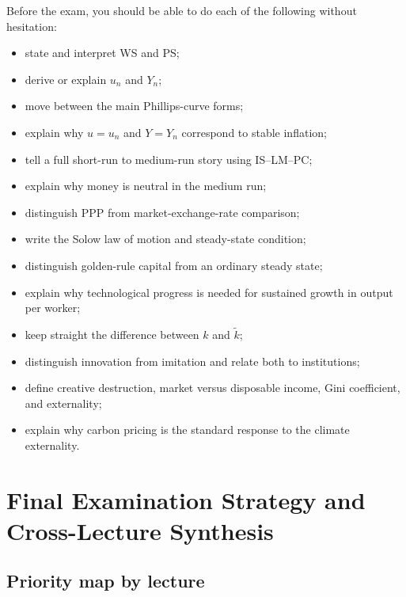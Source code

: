 \documentclass[12pt]{article}
\begin{document}
\begin{examtip}[title={Exam Focus: Final checklist}]
Before the exam, you should be able to do each of the following without hesitation:
\begin{itemize}[leftmargin=1.5em]
\item state and interpret WS and PS;
\item derive or explain \(u_n\) and \(Y_n\);
\item move between the main Phillips-curve forms;
\item explain why \(u=u_n\) and \(Y=Y_n\) correspond to stable inflation;
\item tell a full short-run to medium-run story using IS--LM--PC;
\item explain why money is neutral in the medium run;
\item distinguish PPP from market-exchange-rate comparison;
\item write the Solow law of motion and steady-state condition;
\item distinguish golden-rule capital from an ordinary steady state;
\item explain why technological progress is needed for sustained growth in output per worker;
\item keep straight the difference between \(k\) and \(\tilde{k}\);
\item distinguish innovation from imitation and relate both to institutions;
\item define creative destruction, market versus disposable income, Gini coefficient, and externality;
\item explain why carbon pricing is the standard response to the climate externality.
\end{itemize}
\end{examtip}

\newpage
\section{Final Examination Strategy and Cross-Lecture Synthesis}

\subsection{Priority map by lecture}
\end{document}

